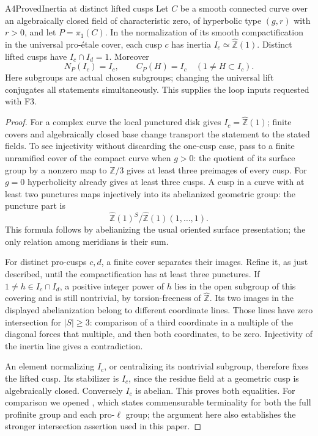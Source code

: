 \begin{result}{A4}{Proved}{Inertia at distinct lifted cusps}
\label{res:A4}
Let $C$ be a smooth connected curve over an algebraically closed field of
characteristic zero, of hyperbolic type $(g,r)$ with $r>0$, and let
$P=\pi_1(C)$. In the normalization of its smooth compactification in the
universal pro-\'etale cover, each cusp $c$ has inertia
$I_c\simeq\widehat{\mathbb Z}(1)$. Distinct lifted cusps have
$I_c\cap I_d=1$. Moreover
\[
 N_P(I_c)=I_c,\qquad C_P(H)=I_c\quad(1\ne H\subset I_c).
\]
Here subgroups are actual chosen subgroups; changing the universal lift
conjugates all statements simultaneously. This supplies the loop inputs
requested with F3.
\end{result}
\begin{proof}
For a complex curve the local punctured disk gives $I_c=\widehat{\mathbb Z}(1)$;
finite covers and algebraically closed base change transport the statement
to the stated fields. To see injectivity without discarding the one-cusp
case, pass to a finite unramified cover of the compact curve when $g>0$:
the quotient of its surface group by a nonzero map to $\mathbb Z/3$ gives
at least three preimages of every cusp. For $g=0$ hyperbolicity already
gives at least three cusps. A cusp in a curve with at least two punctures
maps injectively into its abelianized geometric group: the puncture part is
\[
 \widehat{\mathbb Z}(1)^{S}/
 \widehat{\mathbb Z}(1)(1,\ldots,1).
\]
This formula follows by abelianizing the usual oriented surface
presentation; the only relation among meridians is their sum.

For distinct pro-cusps $c,d$, a finite cover separates their images.
Refine it, as just described, until the compactification has at least three
punctures. If $1\ne h\in I_c\cap I_d$, a positive integer power of $h$
lies in the open subgroup of this covering and is still nontrivial, by
torsion-freeness of $\widehat{\mathbb Z}$. Its two images in the displayed
abelianization belong to different coordinate lines. Those lines have
zero intersection for $|S|\geq3$: comparison of a third coordinate in a
multiple of the diagonal forces that multiple, and then both coordinates,
to be zero. Injectivity of the inertia line gives a contradiction.

An element normalizing $I_c$, or centralizing its nontrivial subgroup,
therefore fixes the lifted cusp. Its stabilizer is $I_c$, since the residue
field at a geometric cusp is algebraically closed. Conversely $I_c$ is
abelian. This proves both equalities. For comparison we opened
\cite[Lemma 1.3.7]{AB_Mochizuki2004}, which states commensurable
terminality for both the full profinite group and each pro-$\ell$ group;
the argument here also establishes the stronger intersection assertion
used in this paper.
\end{proof}

